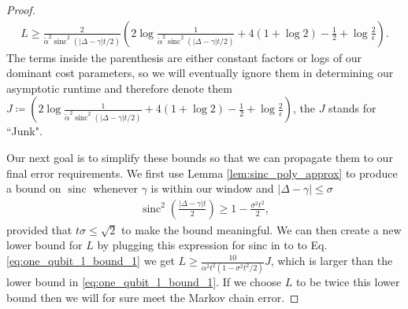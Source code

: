 \documentclass{article}
\DeclareMathOperator{\sinc}{sinc}
\begin{document}
\begin{proof}
 \begin{align}
     L \ge \frac{2}{\widetilde{\alpha}^2 \sinc^2(|\Delta - \gamma|t/2)} \left( 2 \log \frac{1}{\widetilde{\alpha}^2 \sinc^2(|\Delta - \gamma|t/2)} + 4( 1 + \log 2) - \frac{1}{2} + \log \frac{2}{\epsilon} \right). \label{eq:one_qubit_l_bound_1}
 \end{align}
 The terms inside the parenthesis are either constant factors or logs of our dominant cost parameters, so we will eventually ignore them in determining our asymptotic runtime and therefore denote them $J \coloneqq \left( 2 \log \frac{1}{\widetilde{\alpha}^2 \sinc^2(|\Delta - \gamma|t/2)} + 4( 1 + \log 2) - \frac{1}{2} + \log \frac{2}{\epsilon} \right)$, the $J$ stands for ``Junk".

 Our next goal is to simplify these bounds so that we can propagate them to our final error requirements. We first use Lemma \ref{lem:sinc_poly_approx} to produce a  bound on $\sinc$ whenever $\gamma$ is within our window and $|\Delta - \gamma| \le \sigma$
 \begin{align}
     \sinc^2\left( \frac{|\Delta - \gamma| t}{2} \right) \ge 1 - \frac{\sigma^2 t^2}{2},
 \end{align}
 provided that $t \sigma \le \sqrt{2}$ to make the bound meaningful. We can then create a new lower bound for $L$ by plugging this expression for sinc in to to Eq. \eqref{eq:one_qubit_l_bound_1} we get $L \ge \frac{10}{\alpha^2 t^2(1 - \sigma^2 t^2 / 2)} J$, which is larger than the lower bound in \eqref{eq:one_qubit_l_bound_1}. If we choose $L$ to be twice this lower bound then we will for sure meet the Markov chain error. 
 

\end{proof}
\end{document}
